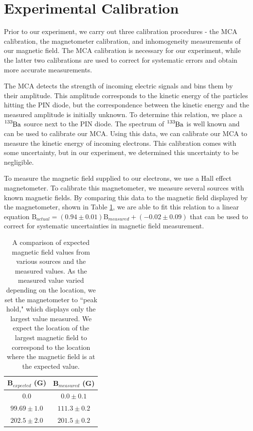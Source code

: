 \section{Experimental Calibration}
Prior to our experiment, we carry out three calibration procedures - the MCA calibration, the magnetometer calibration, and inhomogeneity measurements of our magnetic field. The MCA calibration is necessary for our experiment, while the latter two calibrations are used to correct for systematic errors and obtain more accurate measurements.

The MCA detects the strength of incoming electric signals and bins them by their amplitude. This amplitude corresponds to the kinetic energy of the particles hitting the PIN diode, but the correspondence between the kinetic energy and the measured amplitude is initially unknown. To determine this relation, we place a $\tensor*[^{133}]{\text{Ba}}{}$ source next to the PIN diode. The spectrum of $\tensor*[^{133}]{\text{Ba}}{}$ is well known and can be used to calibrate our MCA. %
Using this data, we can calibrate our MCA to measure the kinetic energy of incoming electrons. This calibration comes with some uncertainty, but in our experiment, we determined this uncertainty to be negligible. 

To measure the magnetic field supplied to our electrons, we use a Hall effect magnetometer. To calibrate this magnetometer, we measure several sources with known magnetic fields. By comparing this data to the magnetic field displayed by the magnetometer, shown in Table \ref{magnetometer}, we are able to fit this relation to a linear equation $\text{B}_{actual} = (0.94 \pm 0.01)\text{B}_{measured} + (-0.02 \pm 0.09)$ that can be used to correct for systematic uncertainties in magnetic field measurement. 
\begin{table}[h]
\begin{tabular}{||c c||}
  \hline
      B$_{expected}$ (G)&B$_{measured}$ (G)\\
      \hline
      \hline
      $0.0$ & $0.0 \pm 0.1$ \\
      \hline
      $99.69 \pm 1.0$ & $111.3 \pm 0.2$ \\
      \hline
      $202.5 \pm 2.0$ & $201.5 \pm 0.2$ \\
      \hline
    \end{tabular}
  \caption{A comparison of expected magnetic field values from various sources and the measured values. As the measured value varied depending on the location, we set the magnetometer to ``peak hold," which displays only the largest value measured. We expect the location of the largest magnetic field to correspond to the location where the magnetic field is at the expected value.}
  \label{magnetometer}
\end{table}

